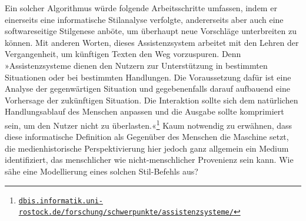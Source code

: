 \documentclass[a4paper,11pt]{article}
\newcommand{\anf}[1]{»#1«}
\begin{document}
Ein solcher Algorithmus würde folgende Arbeitsschritte umfassen, indem er einerseits eine informatische Stilanalyse verfolgte, andererseits aber auch eine softwareseitige Stilgenese anböte, um überhaupt neue Vorschläge unterbreiten zu können. Mit anderen Worten, dieses Assistenzsystem arbeitet mit den Lehren der Vergangenheit, um künftigen Texten den Weg vorzuspuren. Denn \anf{Assistenzsysteme dienen den Nutzern zur Unterstützung in bestimmten Situationen oder bei bestimmten Handlungen. Die Voraussetzung dafür ist eine Analyse der gegenwärtigen Situation und gegebenenfalls darauf aufbauend eine Vorhersage der zukünftigen Situation. Die Interaktion sollte sich dem natürlichen Handlungsablauf des Menschen anpassen und die Ausgabe sollte komprimiert sein, um den Nutzer nicht zu überlasten.}\footnote{\href{https://dbis.informatik.uni-rostock.de/forschung/schwerpunkte/assistenzsysteme/}{\texttt{dbis.informatik.uni-rostock.de/forschung/schwerpunkte/assistenzsysteme/}}} Kaum notwendig zu erwähnen, dass diese informatische Definition als Gegenüber des Menschen die Maschine setzt, die medienhistorische Perspektivierung hier jedoch ganz allgemein ein Medium identifiziert, das menschlicher wie nicht-menschlicher Provenienz sein kann. Wie sähe eine Modellierung eines solchen Stil-Befehls aus?
\end{document}
